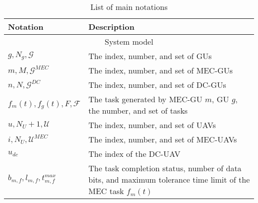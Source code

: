 \begin{table*}[]
\caption{List of main notations}
\label{tab:notation}
\begin{tabularx}{\textwidth}{ll}
\toprule
\textbf{Notation}                      & \textbf{Description}                                                                                                                                               \\ \hline
\multicolumn{2}{c}{System model}                                                                                                                                                                          \\ \hline
$g, N_g, \mathcal{G}$                      & The index, number, and set of GUs                                                                                                                                  \\
$m, M, \mathcal{G}^{MEC}$                        & The index, number, and set of MEC-GUs                                                                                                                              \\
$n, N, \mathcal{G}^{DC}$                       & The index, number, and set of DC-GUs                                                                                                                              \\
$f_m(t), f_g(t), F, \mathcal{F}$                        & The task generated by MEC-GU $m$, GU $g$, the number, and set of tasks                                                                                                                                \\
$u, N_U+1, \mathcal{U}$                      & The index, number, and set of UAVs                                                                                                                                 \\
$i, N_U, \mathcal{U}^{MEC}$                      & The index, number, and set of MEC-UAVs                                                                                                                             \\
$u_{dc}$                                        & The index of the DC-UAV                                                                                                                                                         \\
$b_{m,f}, l_{m,f}, t_{m,f}^{max}$                 & The task completion status, number of data bits, and maximum tolerance time limit of the MEC task $f_m(t)$ \\

\end{tabularx}
\end{table*}
